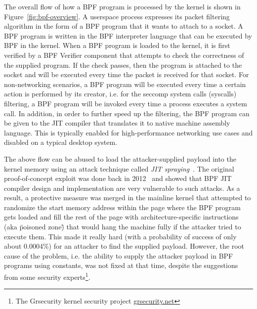 The overall flow of how a BPF program is processed by the kernel is shown in Figure~\ref{fig:bpf-overview}.  
A userspace process expresses its packet filtering algorithm in the form of a BPF program that it wants to attach to a socket. A BPF program is written in the BPF interpreter language that can be executed by BPF in the kernel. When a BPF program is loaded to the kernel, it is first verified by a BPF Verifier component that attempts to check the correctness of the supplied program. If the check passes, then the program is attached to the socket and will be executed every time the packet is received for that socket. For non-networking scenarios, a BPF program will be executed every time a certain action is performed by its creator, i.e. for the seccomp system calls (syscalls) filtering, a BPF program will be invoked every time a process executes a system call. In addition, in order to further speed up the filtering, the BPF program can be given to the JIT compiler that translates it to native machine assembly language. This is typically enabled for high-performance networking use cases and disabled on a typical desktop system.  

The above flow can be abused to load the attacker-supplied payload into the kernel memory using an attack technique called \textit{JIT spraying}~\cite{blazakis2010, bania2010jit}. The original proof-of-concept exploit was done back in 2012~\cite{mcallister2012attacking} and showed that BPF JIT compiler design and implementation are very vulnerable to such attacks. As a result, a protective measure was merged in the mainline kernel that attempted to randomize the start memory address within the page where the BPF program gets loaded and fill the rest of the page with architecture-specific instructions (aka \"poisoned zone\") that would hang the machine fully if the attacker tried to execute them. This made it really hard (with a probability of success of only about 0.0004\%) for an attacker to find the supplied payload. However, the root cause of the problem, i.e. the ability to supply the attacker payload in BPF programs using constants, was not fixed at that time, despite the suggestions from some security experts\footnote{The Grsecurity kernel security project \url{grsecurity.net}}.


